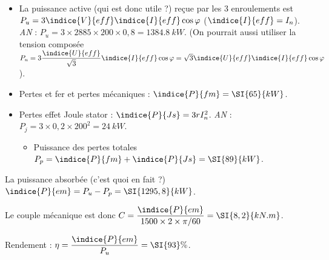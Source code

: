 \ifprof
\begin{corrige}

\begin{itemize}
\item La puissance active (qui est donc utile ?) reçue par les 3 enroulements est $P_u = 3 \indice{V}{eff}\indice{I}{eff} \cos \varphi$ ($\indice{I}{eff}=I_n$). \textit{AN} : $P_u = 3 \times 2885 \times 200 \times 0,8 =\SI{1384,8}{kW} $. (On pourrait aussi utiliser la tension composée $P_u = 3 \dfrac{\indice{U}{eff}}{\sqrt{3}}\indice{I}{eff} \cos \varphi = \sqrt{3}\indice{U}{eff}\indice{I}{eff} \cos \varphi$).
\item Pertes et fer et pertes mécaniques : $\indice{P}{fm}= \SI{65}{kW}$.
\item Pertes effet Joule stator : $\indice{P}{Js} = 3 r I_n^2$. \textit{AN} : $P_j = 3 \times 0,2 \times 200^2 =\SI{24}{kW}$.
\begin{itemize}
\item Puissance des pertes totales $P_p =\indice{P}{fm}+\indice{P}{Js} =\SI{89}{kW}$. 
\end{itemize}
\end{itemize}

La puissance absorbée (c'est quoi en fait ?) $\indice{P}{em} = P_u-P_p=\SI{1295,8}{kW}$.

Le couple mécanique est donc $C = \dfrac{\indice{P}{em}}{1500\times2 \times \pi / 60} = \SI{8,2}{kN.m} $.

Rendement : $\eta = \dfrac{\indice{P}{em}}{P_u}= \SI{93}{\%}$.
\end{corrige}
\else
\fi

\ifprof
\else
\begin{marginfigure}[-3cm]
\centering
\end{marginfigure}
\fi




